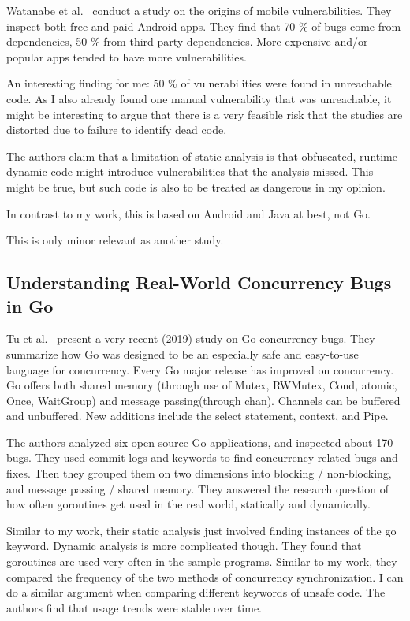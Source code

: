 Watanabe et al.~\cite{watanabe2017} conduct a study on the origins of mobile vulnerabilities.
They inspect both free and paid Android apps.
They find that 70 \% of bugs come from dependencies, 50 \% from third-party dependencies.
More expensive and/or popular apps tended to have more vulnerabilities.

An interesting finding for me: 50 \% of vulnerabilities were found in unreachable code.
As I also already found one manual vulnerability that was unreachable, it might be interesting to argue that there is a
very feasible risk that the studies are distorted due to failure to identify dead code.

The authors claim that a limitation of static analysis is that obfuscated, runtime-dynamic code might introduce
vulnerabilities that the analysis missed.
This might be true, but such code is also to be treated as dangerous in my opinion.

In contrast to my work, this is based on Android and Java at best, not Go.

This is only minor relevant as another study.



\subsection{Understanding Real-World Concurrency Bugs in Go}
\label{subsec:understanding-real-world-concurrency-bugs-in-go}

Tu et al.~\cite{tu2019} present a very recent (2019) study on Go concurrency bugs.
They summarize how Go was designed to be an especially safe and easy-to-use language for concurrency.
Every Go major release has improved on concurrency.
Go offers both shared memory (through use of Mutex, RWMutex, Cond, atomic, Once, WaitGroup) and message passing(through
chan).
Channels can be buffered and unbuffered.
New additions include the select statement, context, and Pipe.

The authors analyzed six open-source Go applications, and inspected about 170 bugs.
They used commit logs and keywords to find concurrency-related bugs and fixes.
Then they grouped them on two dimensions into blocking / non-blocking, and message passing / shared memory.
They answered the research question of how often goroutines get used in the real world, statically and dynamically.

Similar to my work, their static analysis just involved finding instances of the go keyword.
Dynamic analysis is more complicated though.
They found that goroutines are used very often in the sample programs.
Similar to my work, they compared the frequency of the two methods of concurrency synchronization.
I can do a similar argument when comparing different keywords of unsafe code.
The authors find that usage trends were stable over time.

